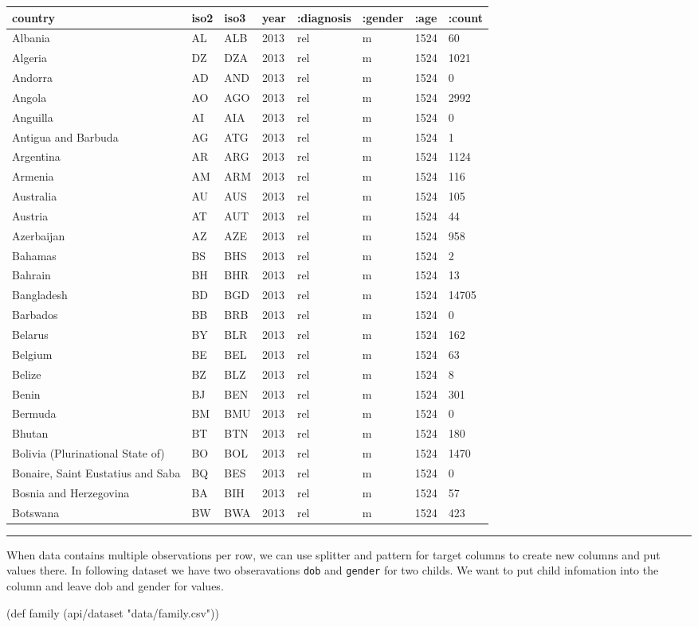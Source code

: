 \documentclass[]{article}
\newenvironment{Shaded}{\begin{snugshade}}{\end{snugshade}}
\newcommand{\StringTok}[1]{\textcolor[rgb]{0.31,0.60,0.02}{#1}}
\newcommand{\FunctionTok}[1]{\textcolor[rgb]{0.00,0.00,0.00}{#1}}
\newcommand{\BuiltInTok}[1]{#1}
\newcommand{\NormalTok}[1]{#1}
\begin{document}
\begin{longtable}[]{@{}llllllll@{}}
\toprule
country & iso2 & iso3 & year & :diagnosis & :gender & :age &
:count\tabularnewline
\midrule
\endhead
Albania & AL & ALB & 2013 & rel & m & 1524 & 60\tabularnewline
Algeria & DZ & DZA & 2013 & rel & m & 1524 & 1021\tabularnewline
Andorra & AD & AND & 2013 & rel & m & 1524 & 0\tabularnewline
Angola & AO & AGO & 2013 & rel & m & 1524 & 2992\tabularnewline
Anguilla & AI & AIA & 2013 & rel & m & 1524 & 0\tabularnewline
Antigua and Barbuda & AG & ATG & 2013 & rel & m & 1524 &
1\tabularnewline
Argentina & AR & ARG & 2013 & rel & m & 1524 & 1124\tabularnewline
Armenia & AM & ARM & 2013 & rel & m & 1524 & 116\tabularnewline
Australia & AU & AUS & 2013 & rel & m & 1524 & 105\tabularnewline
Austria & AT & AUT & 2013 & rel & m & 1524 & 44\tabularnewline
Azerbaijan & AZ & AZE & 2013 & rel & m & 1524 & 958\tabularnewline
Bahamas & BS & BHS & 2013 & rel & m & 1524 & 2\tabularnewline
Bahrain & BH & BHR & 2013 & rel & m & 1524 & 13\tabularnewline
Bangladesh & BD & BGD & 2013 & rel & m & 1524 & 14705\tabularnewline
Barbados & BB & BRB & 2013 & rel & m & 1524 & 0\tabularnewline
Belarus & BY & BLR & 2013 & rel & m & 1524 & 162\tabularnewline
Belgium & BE & BEL & 2013 & rel & m & 1524 & 63\tabularnewline
Belize & BZ & BLZ & 2013 & rel & m & 1524 & 8\tabularnewline
Benin & BJ & BEN & 2013 & rel & m & 1524 & 301\tabularnewline
Bermuda & BM & BMU & 2013 & rel & m & 1524 & 0\tabularnewline
Bhutan & BT & BTN & 2013 & rel & m & 1524 & 180\tabularnewline
Bolivia (Plurinational State of) & BO & BOL & 2013 & rel & m & 1524 &
1470\tabularnewline
Bonaire, Saint Eustatius and Saba & BQ & BES & 2013 & rel & m & 1524 &
0\tabularnewline
Bosnia and Herzegovina & BA & BIH & 2013 & rel & m & 1524 &
57\tabularnewline
Botswana & BW & BWA & 2013 & rel & m & 1524 & 423\tabularnewline
\bottomrule
\end{longtable}

\begin{center}\rule{0.5\linewidth}{0.5pt}\end{center}

When data contains multiple observations per row, we can use splitter
and pattern for target columns to create new columns and put values
there. In following dataset we have two obseravations \texttt{dob} and
\texttt{gender} for two childs. We want to put child infomation into the
column and leave dob and gender for values.

\begin{Shaded}
\begin{Highlighting}[]
\NormalTok{(}\BuiltInTok{def}\FunctionTok{ family }\NormalTok{(api/dataset }\StringTok{"data/family.csv"}\NormalTok{))}
\end{Highlighting}
\end{Shaded}
\end{document}
